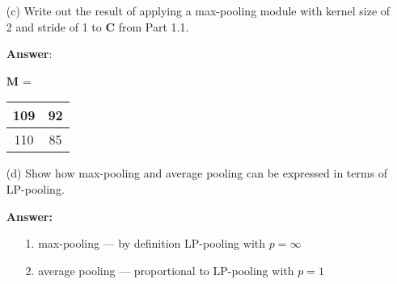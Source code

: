 \documentclass[12pt,letterpaper]{article}
\newcommand{\matr}[1]{\bm{#1}}     %
\begin{document}
\begin{itemize}
   \newpage
    \item[(c)] Write out the result of applying a max-pooling module with kernel size of 2 and stride of 1 to $\matr{C}$ from Part 1.1.
    
    \textbf{Answer}: \\
    \begin{table}[!ht]
        \centering
        $\matr{M}$ = \begin{tabular}{|c|c|} 
        \hline
           109 & 92 \\ \hline 
           110 & 85 \\ \hline 
        \end{tabular}
    \end{table}
  
    \item[(d)] Show how max-pooling and average pooling can be expressed in terms of LP-pooling.
    
    \textbf{Answer:}
    \begin{itemize}
        \item[1.] max-pooling — by definition LP-pooling with $p = \infty$
        \item[2.] average pooling — proportional to LP-pooling with $p = 1$
    \end{itemize}
   
\end{itemize}
\end{document}
